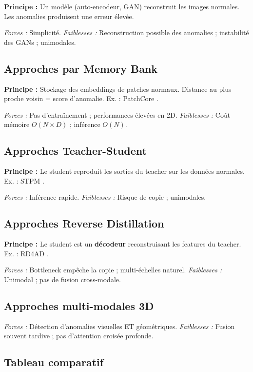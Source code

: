 \documentclass[12pt,a4paper,oneside]{report}
\begin{document}
\textbf{Principe :} Un modèle (auto-encodeur, GAN) reconstruit les images normales. Les anomalies produisent une erreur élevée.

\textit{Forces :} Simplicité. \textit{Faiblesses :} Reconstruction possible des anomalies ; instabilité des GANs ; unimodales.

\subsection{Approches par Memory Bank}

\textbf{Principe :} Stockage des embeddings de patches normaux. Distance au plus proche voisin = score d'anomalie. Ex. : PatchCore \cite{roth2022}.

\textit{Forces :} Pas d'entraînement ; performances élevées en 2D. \textit{Faiblesses :} Coût mémoire $O(N \times D)$ ; inférence $O(N)$.

\subsection{Approches Teacher-Student}

\textbf{Principe :} Le student reproduit les sorties du teacher sur les données normales. Ex. : STPM \cite{wang2021}.

\textit{Forces :} Inférence rapide. \textit{Faiblesses :} Risque de copie ; unimodales.

\subsection{Approches Reverse Distillation}

\textbf{Principe :} Le student est un \textbf{décodeur} reconstruisant les features du teacher. Ex. : RD4AD \cite{deng2022}.

\textit{Forces :} Bottleneck empêche la copie ; multi-échelles naturel. \textit{Faiblesses :} Unimodal ; pas de fusion cross-modale.

\subsection{Approches multi-modales 3D}

\textit{Forces :} Détection d'anomalies visuelles ET géométriques. \textit{Faiblesses :} Fusion souvent tardive ; pas d'attention croisée profonde.

\subsection{Tableau comparatif}
\end{document}
